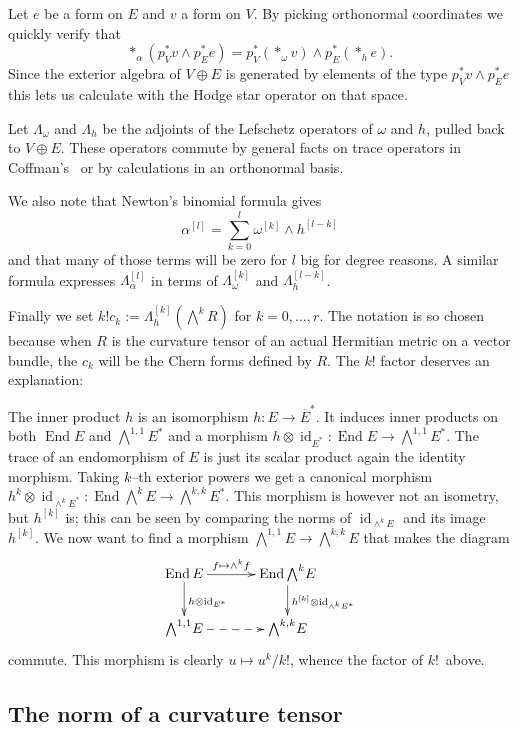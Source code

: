 \documentclass[11pt,a4paper]{amsart}
\def\^#1{^{[#1]}}
\DeclareMathOperator{\id}{id}
\DeclareMathOperator{\End}{End}
\theoremstyle{definition}
\theoremstyle{remark}
\numberwithin{equation}{section}
\begin{document}
Let $e$ be a form on $E$ and $v$ a form on $V$. By picking orthonormal
coordinates we quickly verify that
$$
*_\alpha(p_V^* v \wedge p_E^* e) 
= p_V^*(*_\omega v) \wedge p_E^*(*_h e).
$$
Since the exterior algebra of $V \oplus E$ is generated by elements of the
type $p_V^* v \wedge p_E^* e$ this lets us calculate with the Hodge star
operator on that space.

Let $\Lambda_\omega$ and $\Lambda_h$ be the adjoints of the Lefschetz
operators of $\omega$ and $h$, pulled back to $V \oplus E$. These
operators commute by general facts on trace operators in
Coffman's~\cite{Coffman} or by calculations in an orthonormal basis.

We also note that Newton's binomial formula gives
$$
\alpha\^{l} = \sum_{k=0}^{l} \omega\^{k} \wedge h\^{l-k}
$$
and that many of those terms will be zero for $l$ big for degree
reasons. A similar formula expresses $\Lambda\^{l}_\alpha$ in terms of
$\Lambda\^{k}_\omega$ and $\Lambda\^{l-k}_h$.

Finally we set $k! c_k := \Lambda\^{k}_h (\bigwedge^k \! R)$ for $k = 0, \ldots,
r$.  The notation is so chosen because when $R$ is the curvature tensor of
an actual Hermitian metric on a vector bundle, the $c_k$ will be the Chern
forms defined by $R$. The $k!$ factor deserves an explanation:

The inner product $h$ is an isomorphism $h : E \to \overline E^*$. It
induces inner products on both $\End E$ and $\bigwedge^{1,1} \! E^*$ and a
morphism $h  \otimes \id_{E^*}: \End E \to \bigwedge^{1,1} \!
E^*$. The trace of an endomorphism of $E$ is just its scalar product
again the identity morphism.  Taking $k$--th exterior powers we get a
canonical morphism
$h^k \otimes \id_{\wedge^k E^*} : \End \bigwedge^k \! E \to
\bigwedge^{k,k} \! E^*$. This morphism is however not an isometry, but
$h\^k$ is; this can be seen by comparing the norms of $\id_{\wedge^k
E}$ and its image $h\^k$. We now want to find a morphism
$\bigwedge^{1,1} \! E \to \bigwedge^{k,k} \! E$ that makes the diagram
$$
\xymatrix@C+10pt@R-3pt{
    \End E \ar[r]^-{f \mapsto \wedge^k f} \ar[d]^{h \otimes \id_{E^*}} & 
    \End \bigwedge^{k} \! E \ar[d]^{h\^k \otimes \id_{\wedge^k E^*}} \\
    \bigwedge^{1,1} \! E \ar@{-->}[r] 
    & \bigwedge^{k,k} \! E
}
$$
commute. This morphism is clearly $u \mapsto u^k / k!$, whence the factor
of $k!$~above.%



\subsection*{The norm of a curvature tensor}
\end{document}

